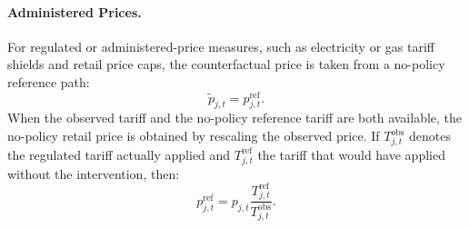 \documentclass[11pt]{article}
\begin{document}

\paragraph{Administered Prices.}
For regulated or administered-price measures, such as electricity or gas tariff shields and retail
price caps, the counterfactual price is taken from a no-policy reference path:
\begin{equation}
\widetilde p_{j,t}
=
p^{\mathrm{ref}}_{j,t}.
\end{equation}
When the observed tariff and the no-policy reference tariff are both available, the no-policy retail
price is obtained by rescaling the observed price. If $T^{\mathrm{obs}}_{j,t}$ denotes the regulated
tariff actually applied and $T^{\mathrm{ref}}_{j,t}$ the tariff that would have applied without the
intervention, then:
\begin{equation}
p^{\mathrm{ref}}_{j,t}
=
p_{j,t}
\frac{T^{\mathrm{ref}}_{j,t}}{T^{\mathrm{obs}}_{j,t}} .
\end{equation}

\end{document}
